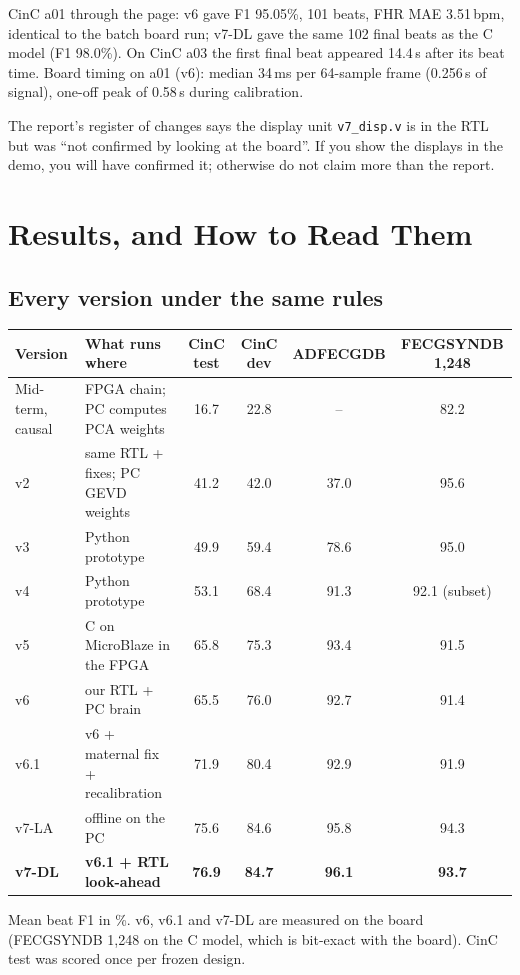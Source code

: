 \documentclass[11pt]{article}
\newcommand{\ttt}[1]{\texttt{#1}}
\begin{document}
\begin{keyfact}
CinC a01 through the page: v6 gave F1 95.05\%, 101 beats, FHR MAE 3.51\,bpm, identical to the batch board run; v7-DL gave the same 102 final beats as the C model (F1 98.0\%). On CinC a03 the first final beat appeared 14.4\,s after its beat time. Board timing on a01 (v6): median 34\,ms per 64-sample frame (0.256\,s of signal), one-off peak of 0.58\,s during calibration.
\end{keyfact}

\begin{warn}
The report's register of changes says the display unit \ttt{v7\_disp.v} is in the RTL but was ``not confirmed by looking at the board''. If you show the displays in the demo, you will have confirmed it; otherwise do not claim more than the report.
\end{warn}

\section{Results, and How to Read Them}
\label{sec:results}

\subsection{Every version under the same rules}
\begin{center}
\small
\begin{tabularx}{\linewidth}{@{}l X c c c c@{}}
\toprule
\textbf{Version} & \textbf{What runs where} & \textbf{CinC test} & \textbf{CinC dev} & \textbf{ADFECGDB} & \textbf{FECGSYNDB 1,248} \\
\midrule
Mid-term, causal & FPGA chain; PC computes PCA weights & 16.7 & 22.8 & -- & 82.2 \\
v2 & same RTL + fixes; PC GEVD weights & 41.2 & 42.0 & 37.0 & 95.6 \\
v3 & Python prototype & 49.9 & 59.4 & 78.6 & 95.0 \\
v4 & Python prototype & 53.1 & 68.4 & 91.3 & 92.1 (subset) \\
v5 & C on MicroBlaze in the FPGA & 65.8 & 75.3 & 93.4 & 91.5 \\
v6 & our RTL + PC brain & 65.5 & 76.0 & 92.7 & 91.4 \\
v6.1 & v6 + maternal fix + recalibration & 71.9 & 80.4 & 92.9 & 91.9 \\
v7-LA & offline on the PC & 75.6 & 84.6 & 95.8 & 94.3 \\
\textbf{v7-DL} & \textbf{v6.1 + RTL look-ahead} & \textbf{76.9} & \textbf{84.7} & \textbf{96.1} & \textbf{93.7} \\
\bottomrule
\end{tabularx}
\end{center}
Mean beat F1 in \%. v6, v6.1 and v7-DL are measured on the board (FECGSYNDB 1,248 on the C model, which is bit-exact with the board). CinC test was scored once per frozen design.
\end{document}
